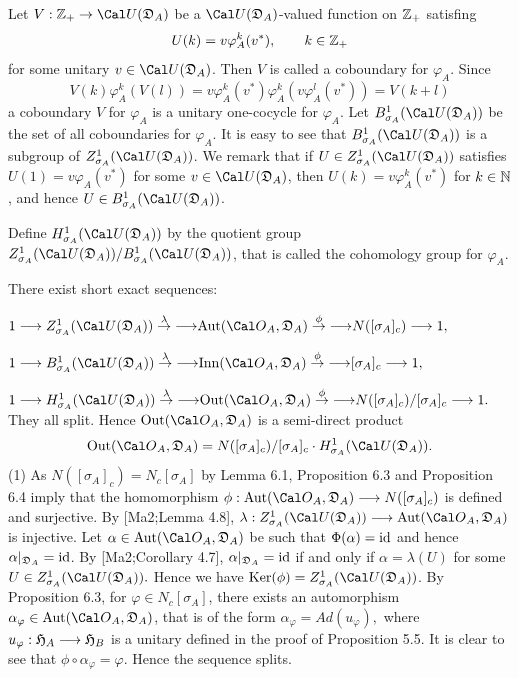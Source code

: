 Let $V: \Zp \rightarrow {\Cal U}(\DA)$ be a ${\Cal U}(\DA)$-valued function on 
${ {\Bbb Z}_+ }$ satisfing 
$$
U(k) = v \varphi_A^k(v^*), \qquad k \in { {\Bbb Z}_+ }
$$
for some unitary
$v \in {\Cal U}(\DA)$.
Then $V$ is called a coboundary for $\varphi_A$.
Since
$$
V(k) \varphi_A^k(V(l)) = v \varphi_A^k(v^*)\varphi_A^k(v \varphi_A^l(v^*))=V(k+l)
$$
 a coboundary $V$ for $\varphi_A$ is a unitary one-cocycle for 
$\varphi_A$.
Let
$B_{\sigma_A}^1({\Cal U}(\DA))$
be the set of all coboundaries for $\varphi_A$.
It is easy to see that
$B_{\sigma_A}^1({\Cal U}(\DA))$ is a subgroup of
$Z_{\sigma_A}^1({\Cal U}(\DA))$.
We remark that 
if $U \in Z_{\sigma_A}^1({\Cal U}(\DA))$
satisfies
$U(1) = v \varphi_A(v^*)$
for some
$v \in {\Cal U}(\DA)$,
then 
$U(k) = v\varphi_A^k(v^*)$ for $k\in \Bbb N$,
and hence $U \in B_{\sigma_A}^1({\Cal U}(\DA))$.

Define 
$H_{\sigma_A}^1({\Cal U}(\DA))$
by the quotient group
$Z_{\sigma_A}^1({\Cal U}(\DA))/B_{\sigma_A}^1({\Cal U}(\DA))$,
that is called the cohomology group for
$\varphi_A$.



There exist short exact sequences: 
\roster
\item
$
1 
\longrightarrow Z_{\sigma_A}^1({\Cal U}(\DA))
\overset{\lambda}\to{\longrightarrow} \Aut(\OA,\DA)
\overset{\phi}\to{\longrightarrow} N([\sigma_A ]_c)
\longrightarrow 1,
$
\item
$
1 
\longrightarrow B_{\sigma_A}^1({\Cal U}(\DA))
\overset{\lambda}\to{\longrightarrow} \Inn(\OA,\DA)
\overset{\phi}\to{\longrightarrow} [\sigma_A ]_c
\longrightarrow 1,
$
\item
$
1 
\longrightarrow H_{\sigma_A}^1({\Cal U}(\DA))
\overset{\lambda}\to{\longrightarrow} \Out(\OA,\DA)
\overset{\phi}\to{\longrightarrow} N([\sigma_A ]_c) / [\sigma_A ]_c
\longrightarrow 1.
$
\endroster
They all split. Hence 
$
\Out(\OA,\DA)
$
is a semi-direct product 
$$
\Out(\OA,\DA)
= N([\sigma_A ]_c) / [\sigma_A ]_c \cdot H_{\sigma_A}^1({\Cal U}(\DA)).
$$ 
\endproclaim
{}
(1)
As $N([\sigma_A]_c) =N_c[\sigma_A]$ by Lemma 6.1,
Proposition 6.3 and Proposition 6.4  imply that the homomorphism
$\phi: \Aut(\OA,\DA) \longrightarrow  N([\sigma_A ]_c)$
is defined and surjective.
By [Ma2;Lemma 4.8],  
$\lambda: Z_{\sigma_A}^1({\Cal U}(\DA)) \longrightarrow \Aut(\OA,\DA)$
is injective.
Let $\alpha \in \Aut(\OA,\DA)$ be such that
$\Phi(\alpha) ={{\operatorname{id}}}$ and hence 
$\alpha|_{{{\frak D}_A}} ={{\operatorname{id}}}$.
By [Ma2;Corollary 4.7],
$\alpha|_{{{\frak D}_A}} ={{\operatorname{id}}}$ if and only if 
$\alpha = \lambda(U) $
for some $U \in Z_{\sigma_A}^1({\Cal U}(\DA)).$
Hence we have
$\Ker(\phi) = Z_{\sigma_A}^1({\Cal U}(\DA))$.
By Proposition 6.3, 
for 
 $\varphi \in N_c[\sigma_A]$, 
there exists an automorphism
$\alpha_{\varphi} \in \Aut(\OA,\DA)$,
that is of the form
$\alpha_{\varphi} = Ad(u_{\varphi}),$
where $u_{\varphi}:{\frak H}_A \longrightarrow {\frak H}_B$
is a unitary defined in the proof of Proposition 5.5.
It is clear to see that 
$\phi \circ \alpha_{\varphi} = \varphi$.
Hence the sequence splits.

